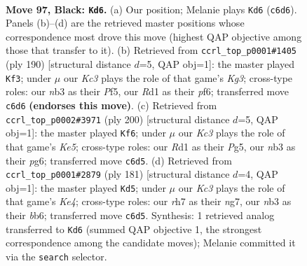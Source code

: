 \documentclass[11pt]{article}
\begin{document}
\clearpage

\begin{figure}[p]\centering
\begin{subfigure}{0.46\textwidth}\centering
\resizebox{\linewidth}{!}{%
\newchessgame
\chessboard[
  setfen={8/7R/2k5/5K2/8/1N6/6P1/3r4 b - - 59 97},
  showmover=false,
  pgfstyle=straightmove, color=movearrow, markmove={c6-d6}
]}
\caption{}
\end{subfigure}\hfill
\begin{subfigure}{0.46\textwidth}\centering
\resizebox{\linewidth}{!}{%
\newchessgame
\chessboard[
  setfen={8/R7/5p1k/5P2/1r6/6K1/8/8 w - - 4 96},
  showmover=false,
  pgfstyle=straightmove, color=movearrow, markmove={g3-f3}
]}
\caption{}
\end{subfigure}
\\[4pt]
\begin{subfigure}{0.46\textwidth}\centering
\resizebox{\linewidth}{!}{%
\newchessgame
\chessboard[
  setfen={6k1/2R5/6p1/4K1P1/7r/8/8/8 w - - 2 101},
  showmover=false,
  pgfstyle=straightmove, color=movearrow, markmove={e5-f6}
]}
\caption{}
\end{subfigure}\hfill
\begin{subfigure}{0.46\textwidth}\centering
\resizebox{\linewidth}{!}{%
\newchessgame
\chessboard[
  setfen={8/6N1/1B6/4k1P1/2r5/6K1/8/8 b - - 12 91},
  showmover=false,
  pgfstyle=straightmove, color=movearrow, markmove={e5-d5}
]}
\caption{}
\end{subfigure}
\caption{\textbf{Move 97, Black: \texttt{Kd6}.} (a) Our position; Melanie plays \texttt{Kd6} (\texttt{c6d6}). Panels (b)--(d) are the retrieved master positions whose correspondence most drove this move (highest QAP objective among those that transfer to it). (b) Retrieved from \texttt{ccrl\_top\_p0001\#1405} (ply 190) [structural distance $d$=5, QAP obj=1]: the master played \texttt{Kf3}; under $\mu$ our \emph{Kc3} plays the role of that game's \emph{Kg3}; cross-type roles: our \emph{n}b3 as their \emph{P}f5, our \emph{R}d1 as their \emph{p}f6; transferred move \texttt{c6d6} \textbf{(endorses this move)}. (c) Retrieved from \texttt{ccrl\_top\_p0002\#3971} (ply 200) [structural distance $d$=5, QAP obj=1]: the master played \texttt{Kf6}; under $\mu$ our \emph{Kc3} plays the role of that game's \emph{Ke5}; cross-type roles: our \emph{R}d1 as their \emph{P}g5, our \emph{n}b3 as their \emph{p}g6; transferred move \texttt{c6d5}. (d) Retrieved from \texttt{ccrl\_top\_p0001\#2879} (ply 181) [structural distance $d$=4, QAP obj=1]: the master played \texttt{Kd5}; under $\mu$ our \emph{Kc3} plays the role of that game's \emph{Ke4}; cross-type roles: our \emph{r}h7 as their \emph{n}g7, our \emph{n}b3 as their \emph{b}b6; transferred move \texttt{c6d5}. Synthesis: 1 retrieved analog transferred to \texttt{Kd6} (summed QAP objective 1, the strongest correspondence among the candidate moves); Melanie committed it via the \texttt{search} selector.}
\label{fig:thought-m193}
\end{figure}
\end{document}
